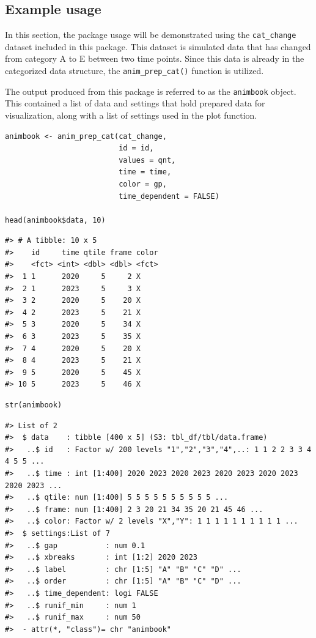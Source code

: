 \hypertarget{example-usage}{%
\subsection{Example usage}\label{example-usage}}

In this section, the package usage will be demonstrated using the \texttt{cat\_change} dataset included in this package. This dataset is simulated data that has changed from category A to E between two time points. Since this data is already in the categorized data structure, the \texttt{anim\_prep\_cat()} function is utilized.

The output produced from this package is referred to as the \texttt{animbook} object. This contained a list of data and settings that hold prepared data for visualization, along with a list of settings used in the plot function.

\begin{verbatim}
animbook <- anim_prep_cat(cat_change, 
                          id = id, 
                          values = qnt, 
                          time = time, 
                          color = gp, 
                          time_dependent = FALSE)

head(animbook$data, 10)
\end{verbatim}

\begin{verbatim}
#> # A tibble: 10 x 5
#>    id     time qtile frame color
#>    <fct> <int> <dbl> <dbl> <fct>
#>  1 1      2020     5     2 X    
#>  2 1      2023     5     3 X    
#>  3 2      2020     5    20 X    
#>  4 2      2023     5    21 X    
#>  5 3      2020     5    34 X    
#>  6 3      2023     5    35 X    
#>  7 4      2020     5    20 X    
#>  8 4      2023     5    21 X    
#>  9 5      2020     5    45 X    
#> 10 5      2023     5    46 X
\end{verbatim}

\begin{verbatim}
str(animbook)
\end{verbatim}

\begin{verbatim}
#> List of 2
#>  $ data    : tibble [400 x 5] (S3: tbl_df/tbl/data.frame)
#>   ..$ id   : Factor w/ 200 levels "1","2","3","4",..: 1 1 2 2 3 3 4 4 5 5 ...
#>   ..$ time : int [1:400] 2020 2023 2020 2023 2020 2023 2020 2023 2020 2023 ...
#>   ..$ qtile: num [1:400] 5 5 5 5 5 5 5 5 5 5 ...
#>   ..$ frame: num [1:400] 2 3 20 21 34 35 20 21 45 46 ...
#>   ..$ color: Factor w/ 2 levels "X","Y": 1 1 1 1 1 1 1 1 1 1 ...
#>  $ settings:List of 7
#>   ..$ gap           : num 0.1
#>   ..$ xbreaks       : int [1:2] 2020 2023
#>   ..$ label         : chr [1:5] "A" "B" "C" "D" ...
#>   ..$ order         : chr [1:5] "A" "B" "C" "D" ...
#>   ..$ time_dependent: logi FALSE
#>   ..$ runif_min     : num 1
#>   ..$ runif_max     : num 50
#>  - attr(*, "class")= chr "animbook"
\end{verbatim}

